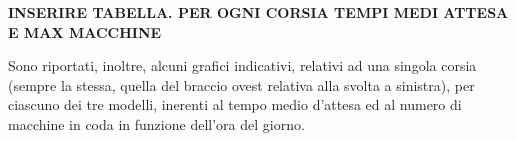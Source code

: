 \textbf{INSERIRE TABELLA. PER OGNI CORSIA TEMPI MEDI ATTESA E MAX MACCHINE}
\newline

Sono riportati, inoltre, alcuni grafici indicativi, relativi ad una singola corsia (sempre la stessa, quella del braccio ovest relativa alla svolta a sinistra), per ciascuno dei tre modelli, inerenti al tempo medio d'attesa ed al numero di macchine in coda in funzione dell'ora del giorno.

















